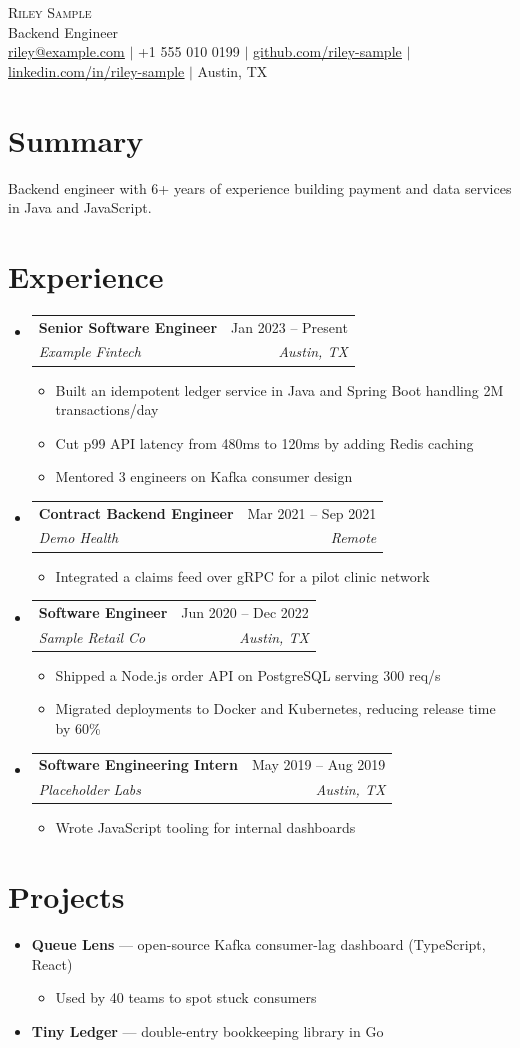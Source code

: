 \documentclass[letterpaper,11pt]{article}
\makeatletter
\newcommand{\resumeItem}[1]{\item\small{#1 \vspace{-2pt}}}
\newcommand{\resumeSubheading}[4]{
  \vspace{-2pt}\item
    \begin{tabular*}{0.97\textwidth}[t]{l@{\extracolsep{\fill}}r}
      \textbf{#1} & #2 \\
      \textit{\small#3} & \textit{\small #4} \\
    \end{tabular*}\vspace{-7pt}
}
\newcommand{\resumeProjectHeading}[2]{\item #1 \hfill #2}
\newcommand{\resumeSubHeadingListStart}{\begin{itemize}[leftmargin=0.15in, label={}]}
\newcommand{\resumeSubHeadingListEnd}{\end{itemize}}
\newcommand{\resumeItemListStart}{\begin{itemize}}
\newcommand{\resumeItemListEnd}{\end{itemize}\vspace{-5pt}}
\makeatother
\begin{document}
\begin{center}
    {\Huge \scshape Riley Sample} \\ \vspace{1pt}
    Backend Engineer \\ \vspace{1pt}
    \small \href{mailto:riley@example.com}{\underline{riley@example.com}} $|$ +1 555 010 0199 $|$
    \href{https://github.com/riley-sample}{\underline{github.com/riley-sample}} $|$
    \href{https://www.linkedin.com/in/riley-sample}{\underline{linkedin.com/in/riley-sample}} $|$ Austin, TX
\end{center}

\section{Summary}
Backend engineer with 6+ years of experience building payment and data services in Java and JavaScript.

\section{Experience}
  \resumeSubHeadingListStart
    \resumeSubheading
      {Senior Software Engineer}{Jan 2023 -- Present}
      {Example Fintech}{Austin, TX}
      \resumeItemListStart
        \resumeItem{Built an idempotent ledger service in Java and Spring Boot handling 2M transactions/day}
        \resumeItem{Cut p99 API latency from 480ms to 120ms by adding Redis caching}
        \resumeItem{Mentored 3 engineers on Kafka consumer design}
      \resumeItemListEnd
    \resumeSubheading
      {Contract Backend Engineer}{Mar 2021 -- Sep 2021}
      {Demo Health}{Remote}
      \resumeItemListStart
        \resumeItem{Integrated a claims feed over gRPC for a pilot clinic network}
      \resumeItemListEnd
    \resumeSubheading
      {Software Engineer}{Jun 2020 -- Dec 2022}
      {Sample Retail Co}{Austin, TX}
      \resumeItemListStart
        \resumeItem{Shipped a Node.js order API on PostgreSQL serving 300 req/s}
        \resumeItem{Migrated deployments to Docker and Kubernetes, reducing release time by 60\%}
      \resumeItemListEnd
    \resumeSubheading
      {Software Engineering Intern}{May 2019 -- Aug 2019}
      {Placeholder Labs}{Austin, TX}
      \resumeItemListStart
        \resumeItem{Wrote JavaScript tooling for internal dashboards}
      \resumeItemListEnd
  \resumeSubHeadingListEnd

\section{Projects}
  \resumeSubHeadingListStart
    \resumeProjectHeading{\textbf{Queue Lens} --- open-source Kafka consumer-lag dashboard (TypeScript, React)}{}
      \resumeItemListStart
        \resumeItem{Used by 40 teams to spot stuck consumers}
      \resumeItemListEnd
    \resumeProjectHeading{\textbf{Tiny Ledger} --- double-entry bookkeeping library in Go}{}
  \resumeSubHeadingListEnd
\end{document}
